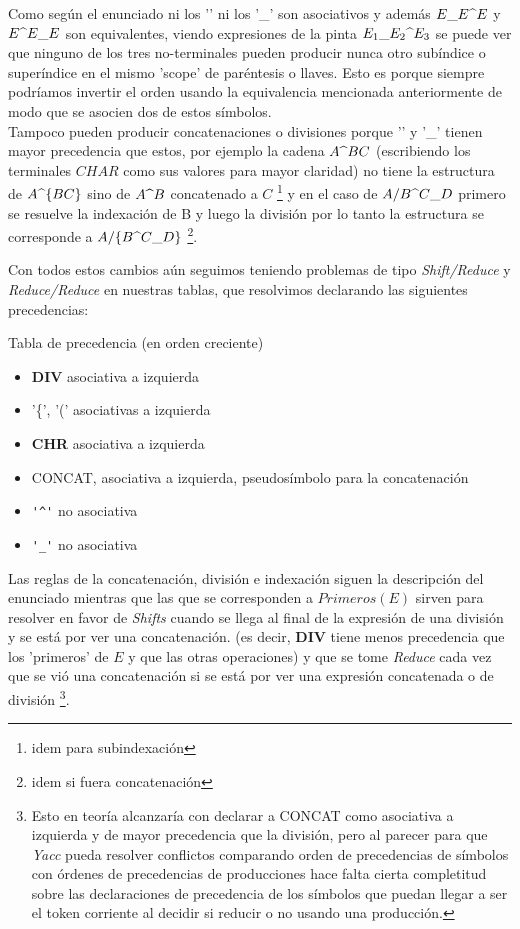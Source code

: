 Como según el enunciado ni los '\super ' ni los '_' son asociativos y además $E\sub  E \super  E$ y $E\super  E \sub  E$ son equivalentes, viendo expresiones de la pinta $E_1 \sub  E_2 \super  E_3$ se puede ver que ninguno de los tres no-terminales pueden producir nunca otro subíndice o superíndice en el mismo 'scope' de paréntesis o llaves. Esto es porque siempre podríamos invertir el orden usando la equivalencia mencionada anteriormente de modo que se asocien dos de estos símbolos. \\
Tampoco pueden producir concatenaciones o divisiones porque '\super' y '_' tienen mayor precedencia que estos, por ejemplo la cadena $A\super BC$ (escribiendo los terminales $CHAR$ como sus valores para mayor claridad) no tiene la estructura de $A\super \{BC\}$ sino de $A\super B$ concatenado a $C$ \footnote{idem para subindexación} y en el caso de $A/B\super C\sub D$ primero se resuelve la indexación de B y luego la división por lo tanto la estructura se corresponde a $A/\{B\super C\sub D\}$ \footnote {idem si fuera concatenación}.

Con todos estos cambios aún seguimos teniendo problemas de tipo \emph{Shift/Reduce} y \emph{Reduce/Reduce} en nuestras tablas, que resolvimos declarando las siguientes precedencias:

Tabla de precedencia (en orden creciente)
\begin{itemize}
	\item \textbf{DIV} asociativa a izquierda

    \item '\{', '(' asociativas a izquierda
    \item \textbf{CHR} asociativa a izquierda
    \item CONCAT, asociativa a izquierda, pseudosímbolo para la concatenación
    \item \verb|'^'| no asociativa
    \item \verb|'_'| no asociativa
\end{itemize}

Las reglas de la concatenación, división e indexación siguen la descripción del enunciado mientras que las que se corresponden a $Primeros(E)$ sirven para resolver en favor de \emph{Shifts} cuando se llega al final de la expresión de una división y se está por ver una concatenación. (es decir, \textbf{DIV} tiene menos precedencia que los 'primeros' de $E$ y que las otras operaciones) y que se tome \emph{Reduce} cada vez que se vió una concatenación si se está por ver una expresión concatenada o de división \footnote{Esto en teoría alcanzaría con declarar a CONCAT como asociativa a izquierda y de mayor precedencia que la división, pero al parecer para que \emph{Yacc} pueda resolver conflictos comparando orden de precedencias de símbolos con órdenes de precedencias de producciones hace falta cierta completitud sobre las declaraciones de precedencia de los símbolos que puedan llegar a ser el token corriente al decidir si reducir o no usando una producción.}.

